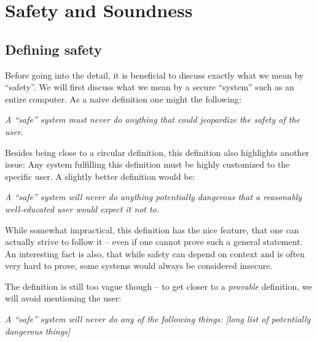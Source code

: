 \chapter{Safety and Soundness}
\label{chap:safesound}


\section{Defining safety}

Before going into the detail, it is beneficial to discuss exactly what we mean
by ``safety''. We will first discuss what we mean by a secure ``system'' such as
an entire computer. As a naive definition one might the following:

\vspace{0.3cm}
\begin{addmargin}{1cm}
  {\it A ``safe'' system must never do anything that could jeopardize the
    safety of the user.}
\end{addmargin}
\vspace{0.3cm}

Besides being close to a circular definition, this definition also highlights
another issue: Any system fulfilling this definition must be highly customized
to the specific user. A slightly better definition would be:

\vspace{0.3cm}
\begin{addmargin}{1cm}
  {\it A ``safe'' system will never do anything potentially dangerous that a
    reasonably well-educated user would expect it not to.}
\end{addmargin}
\vspace{0.3cm}

While somewhat impractical, this definition has the nice feature, that one can
actually strive to follow it -- even if one cannot prove such a general
statement. An interesting fact is also, that while safety can depend on context
and is often very hard to prove, some systems would always be considered
insecure.

The definition is still too vague though -- to get closer to a \emph{provable}
definition, we will avoid mentioning the user:

\vspace{0.3cm}
\begin{addmargin}{1cm}
  {\it A ``safe'' system will never do any of the following things: [long list
    of potentially dangerous things]}
\end{addmargin}
\vspace{0.3cm}


